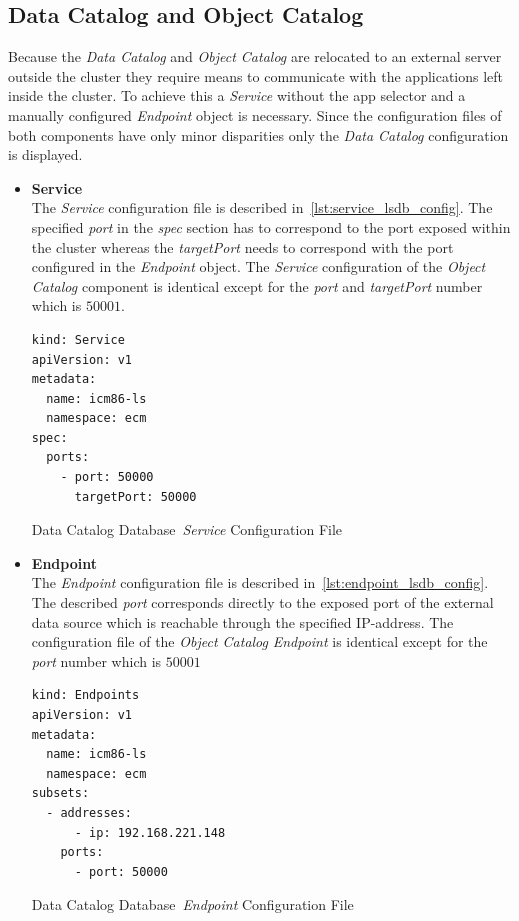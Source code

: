 \subsection{Data Catalog and Object Catalog}
Because the \textit{Data Catalog} and \textit{Object Catalog} are relocated to an external server outside the cluster they require means to communicate with the applications left inside the cluster.
To achieve this a \textit{Service} without the app selector and a manually configured \textit{Endpoint} object is necessary.
Since the configuration files of both components have only minor disparities only the \textit{Data Catalog} configuration is displayed. 
\begin{itemize}
    \item[]{\textbf{Service}\\
    The \textit{Service} configuration file is described in~\cref{lst:service_lsdb_config}.
    The specified \textit{port} in the \textit{spec} section has to correspond to the port exposed within the cluster whereas the \textit{targetPort} needs to correspond with the port configured in the \textit{Endpoint} object.
    The \textit{Service} configuration of the \textit{Object Catalog} component is identical except for the \textit{port} and \textit{targetPort} number which is $50001$.
\begin{Listing}[h]
\begin{lstlisting}
kind: Service
apiVersion: v1
metadata:
  name: icm86-ls
  namespace: ecm
spec:
  ports:
    - port: 50000
      targetPort: 50000
\end{lstlisting}
\caption{Data Catalog Database~\textit{Service} Configuration File}
\label{lst:service_lsdb_config}
\end{Listing}
    }
    \item[]{\textbf{Endpoint}\\
    The \textit{Endpoint} configuration file is described in~\cref{lst:endpoint_lsdb_config}.
    The described \textit{port} corresponds directly to the exposed port of the external data source which is reachable through the specified IP-address.
    The configuration file of the \textit{Object Catalog} \textit{Endpoint} is identical except for the \textit{port} number which is $50001$
    
\begin{Listing}[h]
\begin{lstlisting}
kind: Endpoints
apiVersion: v1
metadata:
  name: icm86-ls
  namespace: ecm
subsets:
  - addresses:
      - ip: 192.168.221.148
    ports:
      - port: 50000
\end{lstlisting}
\caption{Data Catalog Database~\textit{Endpoint} Configuration File}
\label{lst:endpoint_lsdb_config}
\end{Listing}
    }
\end{itemize}

